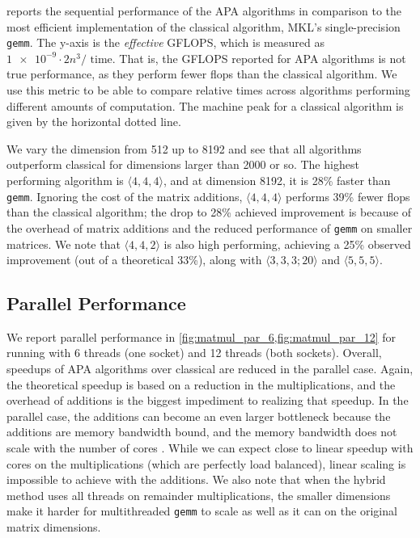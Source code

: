 \documentclass[sigconf,review,anonymous]{acmart}
\newcommand{\dims}[1]{\langle #1 \rangle}
\begin{document}
 reports the sequential performance of the APA algorithms in comparison to the most efficient implementation of the classical algorithm, MKL's single-precision \texttt{gemm}.
The y-axis is the \emph{effective} GFLOPS, which is measured as $\num{1e-9} \cdot 2n^3 / \text{ time}$.
That is, the GFLOPS reported for APA algorithms is not true performance, as they perform fewer flops than the classical algorithm.
We use this metric to be able to compare relative times across algorithms performing different amounts of computation.
The machine peak for a classical algorithm is given by the horizontal dotted line.

We vary the dimension from 512 up to 8192 and see that all algorithms outperform classical for dimensions larger than 2000 or so.
The highest performing algorithm is $\dims{4,4,4}$, and at dimension 8192, it is 28\% faster than \texttt{gemm}.
Ignoring the cost of the matrix additions, $\dims{4,4,4}$ performs 39\% fewer flops than the classical algorithm; the drop to 28\% achieved improvement is because of the overhead of matrix additions and the reduced performance of \texttt{gemm} on smaller matrices.
We note that $\dims{4,4,2}$ is also high performing, achieving a 25\% observed improvement (out of a theoretical 33\%), along with $\dims{3,3,3;20}$ and $\dims{5,5,5}$.

\subsection{Parallel Performance}
\label{sec:matmul_perf_par}

We report parallel performance in \cref{fig:matmul_par_6,fig:matmul_par_12} for running with 6 threads (one socket) and 12 threads (both sockets).
Overall, speedups of APA algorithms over classical are reduced in the parallel case.
Again, the theoretical speedup is based on a reduction in the multiplications, and the overhead of additions is the biggest impediment to realizing that speedup.
In the parallel case, the additions can become an even larger bottleneck because the additions are memory bandwidth bound, and the memory bandwidth does not scale with the number of cores \cite{BB15}.
While we can expect close to linear speedup with cores on the multiplications (which are perfectly load balanced), linear scaling is impossible to achieve with the additions.
We also note that when the hybrid method uses all threads on remainder multiplications, the smaller dimensions make it harder for multithreaded \texttt{gemm} to scale as well as it can on the original matrix dimensions.
\end{document}
